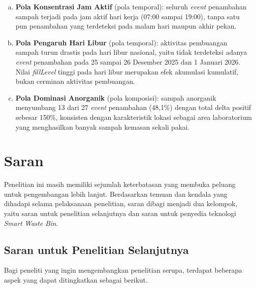 \begin{enumerate}
\begin{enumerate}[a.]
    \item \textbf{Pola Konsentrasi Jam Aktif} (pola temporal): seluruh \textit{event} penambahan sampah terjadi pada jam aktif hari kerja (07:00 sampai 19:00), tanpa satu pun penambahan yang terdeteksi pada malam hari maupun akhir pekan.

    \item \textbf{Pola Pengaruh Hari Libur} (pola temporal): aktivitas pembuangan sampah turun drastis pada hari libur nasional, yaitu tidak terdeteksi adanya \textit{event} penambahan pada 25 sampai 26 Desember 2025 dan 1 Januari 2026. Nilai \textit{fillLevel} tinggi pada hari libur merupakan efek akumulasi kumulatif, bukan cerminan aktivitas pembuangan.

    \item \textbf{Pola Dominasi Anorganik} (pola komposisi): sampah anorganik menyumbang 13 dari 27 \textit{event} penambahan (48,1\%) dengan total delta positif sebesar 150\%, konsisten dengan karakteristik lokasi sebagai area laboratorium yang menghasilkan banyak sampah kemasan sekali pakai.
  \end{enumerate}
\end{enumerate}

\section{Saran}
\label{sec:saran}

Penelitian ini masih memiliki sejumlah keterbatasan yang membuka peluang untuk pengembangan lebih lanjut. Berdasarkan temuan dan kendala yang dihadapi selama pelaksanaan penelitian, saran dibagi menjadi dua kelompok, yaitu saran untuk penelitian selanjutnya dan saran untuk penyedia teknologi \textit{Smart Waste Bin}.

\subsection{Saran untuk Penelitian Selanjutnya}

Bagi peneliti yang ingin mengembangkan penelitian serupa, terdapat beberapa aspek yang dapat ditingkatkan sebagai berikut.

